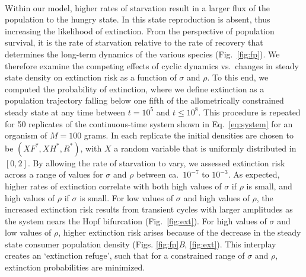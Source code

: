 \documentclass{pnastwo}
\begin{document}
\begin{article}
\\
Within our model, higher rates of starvation result in a larger flux of the population to the hungry state.
In this state reproduction is absent, thus increasing the likelihood of extinction.  From the perspective of population survival, it is the rate of starvation relative to the rate of recovery that determines the long-term dynamics of the various species (Fig.~\ref{fig:fp}).
We therefore examine the competing effects of cyclic dynamics vs.\ changes in steady state density on extinction risk as a function of $\sigma$ and $\rho$.
To this end, we computed the probability of extinction, where we define extinction as a population trajectory falling below one fifth of the allometrically constrained steady state at any time between $t=10^5$ and $t \leq 10^8$.
This procedure is repeated for 50 replicates of the continuous-time system shown in Eq.~\ref{eq:system} for an organism of $M=100$ grams.
In each replicate the initial densities are chosen to be $(XF^*,XH^*,R^*)$, with $X$ a random variable that is uniformly distributed in $[0,2]$.
By allowing the rate of starvation to vary, we assessed extinction risk across a range of values for $\sigma$ and $\rho$ between ca.\ $10^{-7}$ to $10^{-3}$. %
As expected, higher rates of extinction correlate with both high values of $\sigma$ if $\rho$ is small, and high values of $\rho$ if $\sigma$ is small.
For low values of $\sigma$ and high values of $\rho$, the increased extinction risk results from transient cycles with larger amplitudes as the system nears the Hopf bifurcation (Fig.~\ref{fig:ext}).
For high values of $\sigma$ and low values of $\rho$, higher extinction risk arises because of the decrease in the steady state consumer population density (Figs. \ref{fig:fp}\emph{B}, \ref{fig:ext}).
This interplay creates an `extinction refuge', such that for a constrained range of $\sigma$ and $\rho$, extinction probabilities are minimized.


\end{article}
\end{document}
